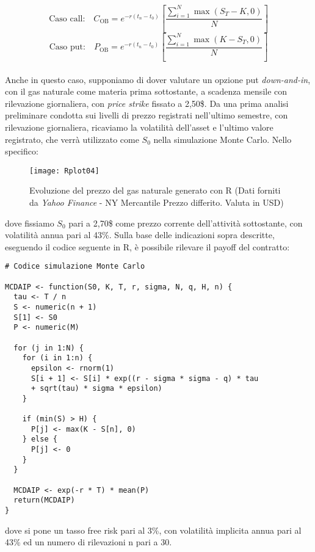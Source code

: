 \documentclass[12pt,a4paper]{report}
\begin{document}
\begin{equation}
\text{Caso call:} \quad C_{\text{OB}} = e^{-r(t_n - t_0)} \left[\frac{\sum_{i=1}^{N}\max(S_T - K, 0)}{N}\right]
\end{equation}
\begin{equation}
\text{Caso put:} \quad P_{\text{OB}} = e^{-r(t_n - t_0)} \left[\frac{\sum_{i=1}^{N}\max(K - S_T, 0)}{N}\right]
\end{equation}
\\

Anche in questo caso, supponiamo di dover valutare un opzione put \textit{down-and-in}, con il gas naturale come materia prima sottostante, a scadenza mensile con rilevazione giornaliera, con \textit{price strike} fissato a 2,50\$. Da una prima analisi preliminare condotta sui livelli di prezzo registrati nell'ultimo semestre, con rilevazione giornaliera, ricaviamo la volatilità dell'asset e l'ultimo valore registrato, che verrà utilizzato come $S_0$ nella simulazione Monte Carlo. Nello specifico:

\begin{figure}
     [ht]
    \centering
    \texttt{[image: Rplot04]}
    \caption{Evoluzione del prezzo del gas naturale generato con R (Dati forniti da \textit{Yahoo Finance} - NY Mercantile Prezzo differito. Valuta in USD)}
    \label{fig:enter-label102}
\end{figure}

dove fissiamo $S_0$ pari a 2,70\$ come prezzo corrente dell'attività sottostante, con volatilità annua pari al 43\%.
Sulla base delle indicazioni sopra descritte, eseguendo il codice seguente in R, è possibile rilevare il payoff del contratto:

\begin{verbatim}
# Codice simulazione Monte Carlo

MCDAIP <- function(S0, K, T, r, sigma, N, q, H, n) {
  tau <- T / n
  S <- numeric(n + 1)
  S[1] <- S0
  P <- numeric(M)
  
  for (j in 1:N) {
    for (i in 1:n) {
      epsilon <- rnorm(1)
      S[i + 1] <- S[i] * exp((r - sigma * sigma - q) * tau
      + sqrt(tau) * sigma * epsilon)
    }
    
    if (min(S) > H) {
      P[j] <- max(K - S[n], 0)
    } else {
      P[j] <- 0
    }
  }
  
  MCDAIP <- exp(-r * T) * mean(P)
  return(MCDAIP)
}
\end{verbatim}

dove si pone un tasso free risk pari al 3\%, con volatilità implicita annua pari al 43\% ed un numero di rilevazioni n pari a 30. 
\end{document}
